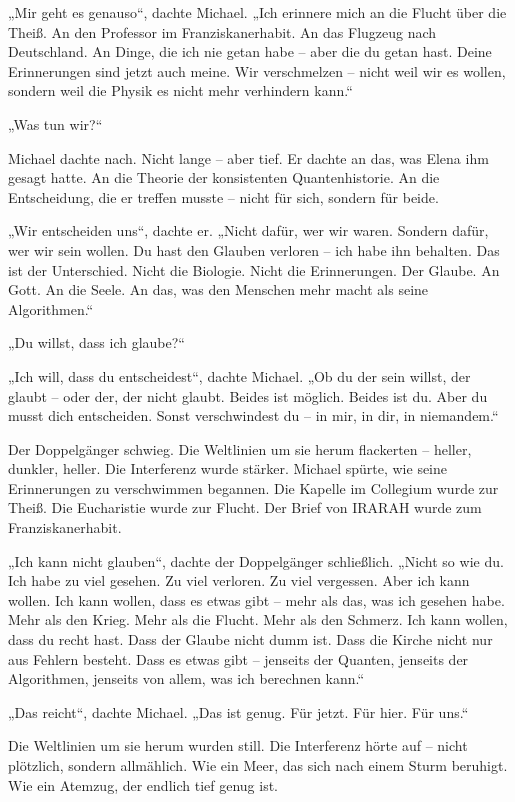\documentclass[
]{article}
\begin{document}
„Mir geht es genauso``, dachte Michael. „Ich erinnere mich an die Flucht über die Theiß. An den Professor im Franziskanerhabit. An das Flugzeug nach Deutschland. An Dinge, die ich nie getan habe -- aber die du getan hast. Deine Erinnerungen sind jetzt auch meine. Wir verschmelzen -- nicht weil wir es wollen, sondern weil die Physik es nicht mehr verhindern kann.``

„Was tun wir?{\kern0pt}``

Michael dachte nach. Nicht lange -- aber tief. Er dachte an das, was Elena ihm gesagt hatte. An die Theorie der konsistenten Quantenhistorie. An die Entscheidung, die er treffen musste -- nicht für sich, sondern für beide.

„Wir entscheiden uns``, dachte er. „Nicht dafür, wer wir waren. Sondern dafür, wer wir sein wollen. Du hast den Glauben verloren -- ich habe ihn behalten. Das ist der Unterschied. Nicht die Biologie. Nicht die Erinnerungen. Der Glaube. An Gott. An die Seele. An das, was den Menschen mehr macht als seine Algorithmen.``

„Du willst, dass ich glaube?{\kern0pt}``

„Ich will, dass du entscheidest``, dachte Michael. „Ob du der sein willst, der glaubt -- oder der, der nicht glaubt. Beides ist möglich. Beides ist du. Aber du musst dich entscheiden. Sonst verschwindest du -- in mir, in dir, in niemandem.``

Der Doppelgänger schwieg. Die Weltlinien um sie herum flackerten -- heller, dunkler, heller. Die Interferenz wurde stärker. Michael spürte, wie seine Erinnerungen zu verschwimmen begannen. Die Kapelle im Collegium wurde zur Theiß. Die Eucharistie wurde zur Flucht. Der Brief von IRARAH wurde zum Franziskanerhabit.

„Ich kann nicht glauben``, dachte der Doppelgänger schließlich. „Nicht so wie du. Ich habe zu viel gesehen. Zu viel verloren. Zu viel vergessen. Aber ich kann wollen. Ich kann wollen, dass es etwas gibt -- mehr als das, was ich gesehen habe. Mehr als den Krieg. Mehr als die Flucht. Mehr als den Schmerz. Ich kann wollen, dass du recht hast. Dass der Glaube nicht dumm ist. Dass die Kirche nicht nur aus Fehlern besteht. Dass es etwas gibt -- jenseits der Quanten, jenseits der Algorithmen, jenseits von allem, was ich berechnen kann.``

„Das reicht``, dachte Michael. „Das ist genug. Für jetzt. Für hier. Für uns.``

Die Weltlinien um sie herum wurden still. Die Interferenz hörte auf -- nicht plötzlich, sondern allmählich. Wie ein Meer, das sich nach einem Sturm beruhigt. Wie ein Atemzug, der endlich tief genug ist.
\end{document}
